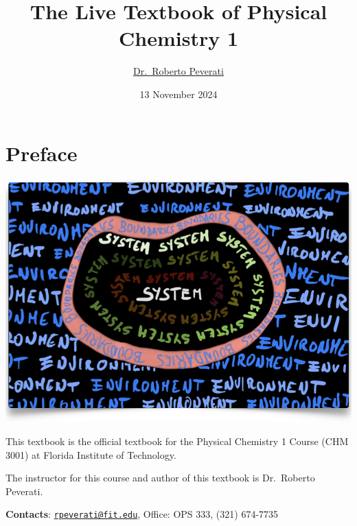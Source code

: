 \documentclass[
  9pt,
]{extbook}
\title{The Live Textbook of Physical Chemistry 1}
\author{\href{mailto:rpeverati@fit.edu}{Dr.~Roberto Peverati}}
\date{13 November 2024}
\let\oldmaketitle\maketitle
\theoremstyle{definition}
\theoremstyle{definition}
\theoremstyle{definition}
\theoremstyle{definition}
\theoremstyle{remark}
\begin{document}
\maketitle


%
\newpage

\let\maketitle\oldmaketitle

\renewcommand\thepage{\romannumeral\numexpr\value{page}-1\relax}


{
\setcounter{tocdepth}{1}
\tableofcontents
}
\renewcommand{\arraystretch}{1.8}

\chapter*{Preface}\label{preface}

\begin{center}\includegraphics[width=0.8\linewidth]{./img/OEP_Figures.000} \end{center}

This textbook is the official textbook for the Physical Chemistry 1 Course (CHM 3001) at Florida Institute of Technology.

The instructor for this course and author of this textbook is Dr.~Roberto Peverati.

\textbf{Contacts}: \href{mailto:rpeverati@fit.edu}{\nolinkurl{rpeverati@fit.edu}}, Office: OPS 333, (321) 674-7735
\end{document}

